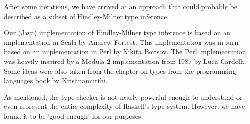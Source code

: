 After some iterations, we have arrived at an approach that could probably be described as a subset of Hindley-Milner type inference.  

Our (Java) implementation of Hindley-Milner type inference is based on an implementation in Scala by Andrew Forrest\cite{forrest}.
This implementation was in turn based on an implementation in Perl by Nikita Borisov\cite{borisov}.
The Perl implementation was heavily inspired by a Modula-2 implementation from 1987 by Luca Cardelli\cite{cardelli}.
Some ideas were also taken from the chapter on types from the programming languages book by Krishnamurthi\cite{plai}.

As mentioned, the type checker is not nearly powerful enough to understand or even represent the entire complexity of Haskell's type system.
However, we have found it to be `good enough' for our purposes.
